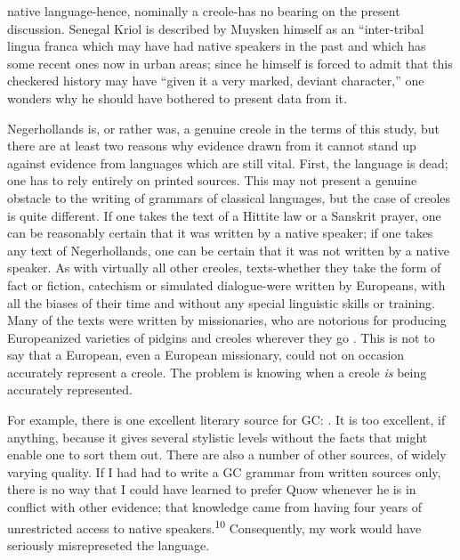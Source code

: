 
native language-hence, nominally a creole-has no bearing on the present discussion. Senegal Kriol is described by Muysken himself as an ``inter-tribal lingua franca which may have had native speakers in the past and which has some recent ones now in urban areas{\textquotedbl}; since he himself is forced to admit that this checkered history may have ``given it a very marked, deviant character,'' one wonders why he should have bothered to present data from it.

Negerhollands is, or rather was, a genuine creole in the terms of this study, but there are at least two reasons why evidence drawn from it cannot stand up against evidence from languages which are still vital. First, the language is dead; one has to rely entirely on printed sources. This may not present a genuine obstacle to the writing of grammars of classical languages, but the case of creoles is quite dif\-ferent. If one takes the text of a Hittite law or a Sanskrit prayer, one can be reasonably certain that it was written by a native speaker; if one takes any text of Negerhollands, one can be certain that it was not written by a native speaker. As with virtually all other creoles, texts-whether they take the form of fact or fiction, catechism or simulated dialogue-were written by Europeans, with all the biases of their time and without any special linguistic skills or training. Many of the texts were written by missionaries, who are notorious for pro\-ducing Europeanized varieties of pidgins and creoles wherever they go \citep{Voorhoeve1971}. This is not to say that a European, even a Euro\-pean missionary, could not on occasion accurately represent a creole. The problem is knowing when a creole \textit{is} being accurately represented.

For example, there is one excellent literary source for GC: \citet{Quow1877}. It is too excellent, if anything, because it gives several stylistic levels without the facts that might enable one to sort them out. There are also a number of other sources, of widely varying quality. If I had had to write a GC grammar from written sources only, there is no way that I could have learned to prefer Quow whenever he is in conflict with other evidence; that knowledge came from having four years of unrestricted access to native speakers.\textsuperscript{1}\textsuperscript{0 }Consequently, my work would have seriously misrepreseted the language.


